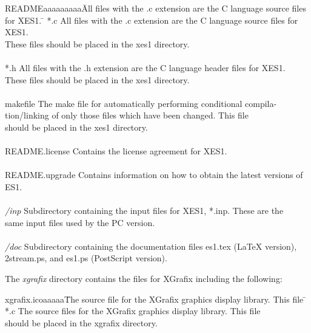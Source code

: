 \begin{section}
\begin{subsection}
\begin{tabbing}
	READMEaaaaaaaaa\=      All files with the .c extension are the C language source files for XES1. \= \kill
        *.c    \>       All files with the .c extension are the C language source files for XES1. \> \\
	       \>      These files should be placed in the xes1 directory. \> \\ 
												     \\
        *.h   \>       All files with the .h extension are the C language header files for XES1.  \> \\
		\>    These files should be placed in the xes1 directory. \> \\ 
										\\
        makefile  \>     The make file for automatically performing conditional compila- \> \\
		  \> tion/linking of only those files which have been changed.  This file \> \\
		  \> should be placed in the xes1 directory. \> \\
												\\
        README.license    \>     Contains the license agreement for XES1. \> \\
										\\
        README.upgrade   \>     Contains information on how to obtain the latest versions of ES1. \> \\
										\\
        {\em /inp}\>      Subdirectory containing the input files for XES1, *.inp.  These are the \> \\
		  \>   same input files used by the PC version. \> \\
										\\
        {\em /doc}\>   Subdirectory containing the documentation files es1.tex (LaTeX version), \> \\
		  \>   2stream.ps, and es1.ps (PostScript version). \> 
										\\
\end{tabbing}
\noindent
   The {\em xgrafix} directory contains the files for XGrafix including the
   following:

\begin{tabbing}	
	xgrafix.icoaaaaa\= The source file for the XGrafix graphics display library.  This file \= \kill
        *.c   \> The source files for the XGrafix graphics display library.  This file \> \\
		    \> should be placed in the xgrafix directory. \> \\
									\\


\end{tabbing}
\end{subsection}
\end{section}
